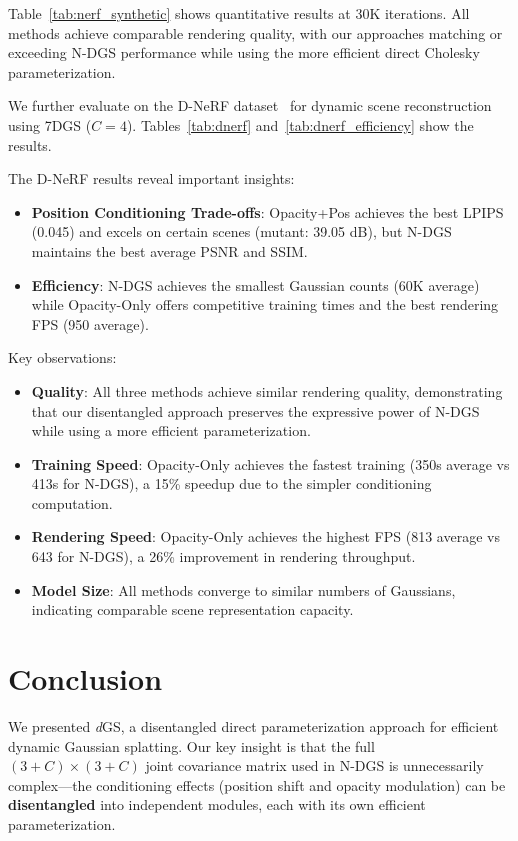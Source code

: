 \documentclass{article}
\newcommand{\modelname}{\textit{d}GS}
\begin{document}
Table~\ref{tab:nerf_synthetic} shows quantitative results at 30K iterations. All methods achieve comparable rendering quality, with our approaches matching or exceeding N-DGS performance while using the more efficient direct Cholesky parameterization.

We further evaluate on the D-NeRF dataset~\cite{pumarola2020d} for dynamic scene reconstruction using 7DGS ($C=4$). Tables~\ref{tab:dnerf} and~\ref{tab:dnerf_efficiency} show the results.

The D-NeRF results reveal important insights:
\begin{itemize}
    \item \textbf{Position Conditioning Trade-offs}: Opacity+Pos achieves the best LPIPS (0.045) and excels on certain scenes (mutant: 39.05 dB), but N-DGS maintains the best average PSNR and SSIM.
    \item \textbf{Efficiency}: N-DGS achieves the smallest Gaussian counts (60K average) while Opacity-Only offers competitive training times and the best rendering FPS (950 average).
\end{itemize}

Key observations:
\begin{itemize}
    \item \textbf{Quality}: All three methods achieve similar rendering quality, demonstrating that our disentangled approach preserves the expressive power of N-DGS while using a more efficient parameterization.
    \item \textbf{Training Speed}: Opacity-Only achieves the fastest training (350s average vs 413s for N-DGS), a 15\% speedup due to the simpler conditioning computation.
    \item \textbf{Rendering Speed}: Opacity-Only achieves the highest FPS (813 average vs 643 for N-DGS), a 26\% improvement in rendering throughput.
    \item \textbf{Model Size}: All methods converge to similar numbers of Gaussians, indicating comparable scene representation capacity.
\end{itemize}

\section{Conclusion}

We presented \modelname{}, a disentangled direct parameterization approach for efficient dynamic Gaussian splatting. Our key insight is that the full $(3+C) \times (3+C)$ joint covariance matrix used in N-DGS is unnecessarily complex---the conditioning effects (position shift and opacity modulation) can be \textbf{disentangled} into independent modules, each with its own efficient parameterization.
\end{document}
